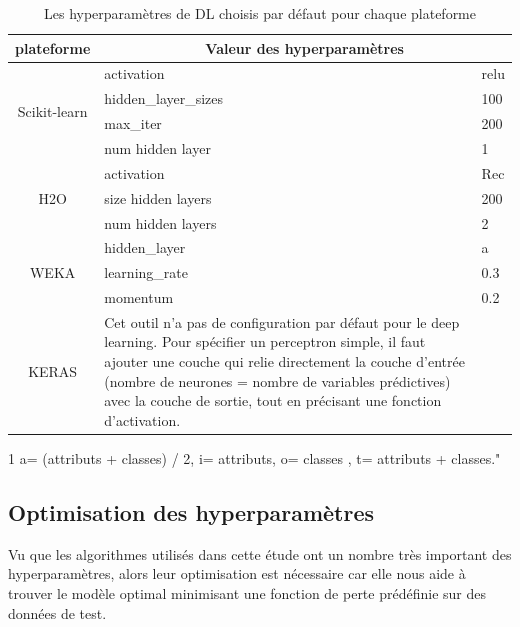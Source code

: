 \begin{itemize}
        \begin{table}[h!]
        \centering
        \begin{threeparttable}[t]
        \begin{tabular}{|c||p{8cm}p{1.5cm}|}
        \hline
        plateforme & \multicolumn{2}{|c|}{Valeur des hyperparamètres}  \\ \hline
        \multirow{4}{*}{Scikit-learn} 
        & activation & relu  \\
        & hidden\_layer\_sizes & 100  \\
        & max\_iter & 200 \\
        & num hidden layer & 1 \\
         \hline
        \multirow{3}{*}{H2O} 
        & activation & Rec\\
        & size hidden layers & 200  \\
        & num hidden layers & 2  \\ 
         \hline
        \multirow{3}{*}{WEKA} 
        & hidden\_layer & a\tnote{1}  \\
        & learning\_rate & 0.3 \\
        & momentum & 0.2  \\ 
         \hline
        \multirow{3}{*}{KERAS} 
        &Cet outil n'a pas de configuration par défaut pour le deep learning. Pour spécifier un perceptron simple, il faut ajouter une couche qui relie directement la couche d’entrée (nombre de neurones = nombre de variables prédictives) avec la couche de sortie, tout en précisant une fonction d’activation.&\\
         \hline
        \end{tabular}
        \footnotesize{
            \begin{tablenotes}
                  \item[1]  a= (attributs + classes) / 2, i= attributs, o= classes , t= attributs + classes."
            \end{tablenotes}
        }
        \end{threeparttable}
        \caption{Les hyperparamètres de DL choisis par défaut pour chaque plateforme}
        \label{tab:DL}
        \end{table}
        
\end{itemize}





\newpage

\subsection{Optimisation des hyperparamètres}\label{opt_algo}
Vu que les algorithmes utilisés dans cette étude ont un nombre très important des hyperparamètres, alors leur optimisation est nécessaire car elle nous aide à trouver le modèle optimal minimisant une fonction de perte prédéfinie sur des données de test.\\

